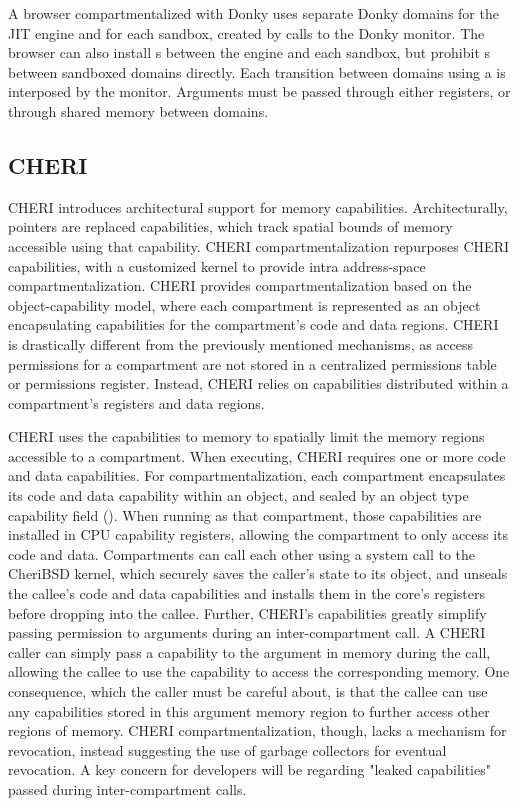 A browser compartmentalized with Donky uses separate Donky domains for the 
JIT engine and for each sandbox, created by calls to the Donky monitor.
The browser can also install s between the engine and each
sandbox, but prohibit s between sandboxed domains directly.
Each transition between domains using a  is interposed by the
monitor.
Arguments must be passed through either registers, or through shared memory
between domains.

\subsection{CHERI}
CHERI introduces architectural support for memory capabilities.
Architecturally, pointers are replaced capabilities, which track 
spatial bounds of memory accessible using that capability. 
CHERI compartmentalization repurposes CHERI capabilities, with a customized
kernel to provide intra address-space compartmentalization.
CHERI provides compartmentalization based on the object-capability model, 
where each compartment is represented as an object encapsulating capabilities
for the compartment's code and data regions.
CHERI is drastically different from the previously mentioned mechanisms,
as access permissions for a compartment are not stored in a centralized
permissions table or permissions register.
Instead, CHERI relies on capabilities distributed within a compartment's 
registers and data regions.

CHERI uses the capabilities to memory to spatially limit the memory regions
accessible to a compartment.
When executing, CHERI requires one or more code and data capabilities. 
For compartmentalization, each compartment encapsulates its code and data
capability within an object, and sealed by an object type capability 
field (). 
When running as that compartment, those capabilities are installed in CPU
capability registers, allowing the compartment to only access its code and data.
Compartments can call each other using a system call to the CheriBSD kernel,
which securely saves the caller's state to its object, and unseals the
callee's code and data capabilities and installs them in the core's registers 
before dropping into the callee.
Further, CHERI's capabilities greatly simplify passing permission to arguments
during an inter-compartment call.
A CHERI caller can simply pass a capability to the argument in memory during
the call, allowing the callee to use the capability to access the corresponding
memory.
One consequence, which the caller must be careful about, is that the callee can
use any capabilities stored in this argument memory region to further access other
regions of memory.
CHERI compartmentalization, though, lacks a mechanism for revocation,
instead suggesting the use of garbage collectors for eventual revocation.
A key concern for developers will be regarding "leaked capabilities" passed during
inter-compartment calls.

